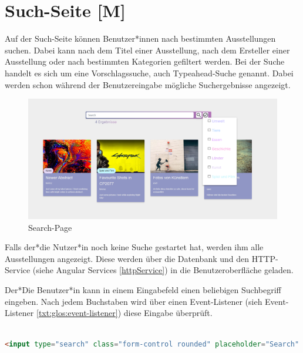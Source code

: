 \section{Such-Seite [M]}
Auf der Such-Seite können Benutzer*innen nach bestimmten Ausstellungen suchen. Dabei kann nach dem Titel einer Ausstellung, nach dem Ersteller einer Ausstellung oder nach bestimmten Kategorien gefiltert werden. Bei der Suche handelt es sich um eine Vorschlagssuche, auch Typeahead-Suche genannt. Dabei werden schon während der Benutzereingabe mögliche Suchergebnisse angezeigt.

\begin{figure} [h t]
  \centering
  \includegraphics[scale=0.55]{pics/search-page.png}
  \caption{Search-Page}
  \label{fig:impl:search-page}
\end{figure}

Falls der*die Nutzer*in noch keine Suche gestartet hat, werden ihm alle Ausstellungen angezeigt. Diese werden über die Datenbank und den HTTP-Service (siehe Angular Services \ref{httpService}) in die Benutzeroberfläche geladen. 

Der*Die Benutzer*in kann in einem Eingabefeld einen beliebigen Suchbegriff eingeben. Nach jedem Buchstaben wird über einen Event-Listener (sieh Event-Listener \ref{txt:glos:event-listener}) diese Eingabe überprüft. 

\begin{lstlisting}[caption={Eingabefeld},language=HTML]
    
<input type="search" class="form-control rounded" placeholder="Search" #input (keyup)="keyUp$.next(input.value)">
    
\end{lstlisting}

